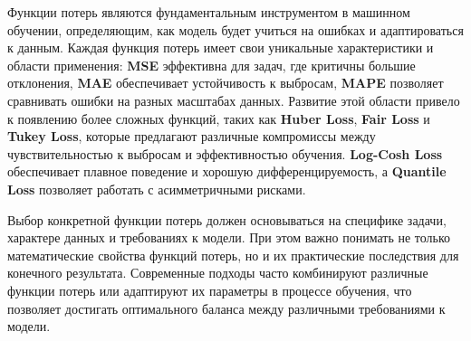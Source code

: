 \documentclass[12pt]{article}
\theoremstyle{definition}
\theoremstyle{definition}
\theoremstyle{definition}
\theoremstyle{remark}
\theoremstyle{remark}
\begin{document}
Функции потерь являются фундаментальным инструментом в машинном обучении, определяющим, как модель будет учиться на ошибках и адаптироваться к данным. Каждая функция потерь имеет свои уникальные характеристики и области применения: \textbf{MSE} эффективна для задач, где критичны большие отклонения, \textbf{MAE} обеспечивает устойчивость к выбросам, \textbf{MAPE} позволяет сравнивать ошибки на разных масштабах данных. Развитие этой области привело к появлению более сложных функций, таких как \textbf{Huber Loss}, \textbf{Fair Loss} и \textbf{Tukey Loss}, которые предлагают различные компромиссы между чувствительностью к выбросам и эффективностью обучения. \textbf{Log-Cosh Loss} обеспечивает плавное поведение и хорошую дифференцируемость, а \textbf{Quantile Loss} позволяет работать с асимметричными рисками. 

Выбор конкретной функции потерь должен основываться на специфике задачи, характере данных и требованиях к модели. При этом важно понимать не только математические свойства функций потерь, но и их практические последствия для конечного результата. Современные подходы часто комбинируют различные функции потерь или адаптируют их параметры в процессе обучения, что позволяет достигать оптимального баланса между различными требованиями к модели.
\end{document}
